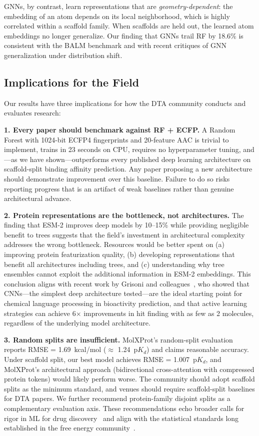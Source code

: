 \documentclass[11pt,twocolumn,a4paper]{article}
\begin{document}
GNNs, by contrast, learn representations that are \emph{geometry-dependent}: the embedding of an atom depends on its local neighborhood, which is highly correlated within a scaffold family. When scaffolds are held out, the learned atom embeddings no longer generalize. Our finding that GNNs trail RF by 18.6\% is consistent with the BALM benchmark and with recent critiques of GNN generalization under distribution shift.

\subsection{Implications for the Field}

Our results have three implications for how the DTA community conducts and evaluates research:

\textbf{1. Every paper should benchmark against RF + ECFP.} A Random Forest with 1024-bit ECFP4 fingerprints and 20-feature AAC is trivial to implement, trains in 23 seconds on CPU, requires no hyperparameter tuning, and---as we have shown---outperforms every published deep learning architecture on scaffold-split binding affinity prediction. Any paper proposing a new architecture should demonstrate improvement over this baseline. Failure to do so risks reporting progress that is an artifact of weak baselines rather than genuine architectural advance.

\textbf{2. Protein representations are the bottleneck, not architectures.} The finding that ESM-2 improves deep models by 10--15\% while providing negligible benefit to trees suggests that the field's investment in architectural complexity addresses the wrong bottleneck. Resources would be better spent on (a) improving protein featurization quality, (b) developing representations that benefit all architectures including trees, and (c) understanding why tree ensembles cannot exploit the additional information in ESM-2 embeddings. This conclusion aligns with recent work by Grisoni and colleagues~\cite{ozcelik2024hitchhiker,tilborg2024active}, who showed that CNNs---the simplest deep architecture tested---are the ideal starting point for chemical language processing in bioactivity prediction, and that active learning strategies can achieve 6$\times$ improvements in hit finding with as few as 2 molecules, regardless of the underlying model architecture.

\textbf{3. Random splits are insufficient.} MolXProt's random-split evaluation reports RMSE = 1.69~kcal/mol ($\approx$ 1.24~p$K_d$) and claims reasonable accuracy. Under scaffold split, our best model achieves RMSE = 1.007~p$K_d$, and MolXProt's architectural approach (bidirectional cross-attention with compressed protein tokens) would likely perform worse. The community should adopt scaffold splits as the minimum standard, and venues should require scaffold-split baselines for DTA papers. We further recommend protein-family disjoint splits as a complementary evaluation axis. These recommendations echo broader calls for rigor in ML for drug discovery~\cite{jimenez2020xai} and align with the statistical standards long established in the free energy community~\cite{shirts2008mbar,mey2024benchmark}.
\end{document}
